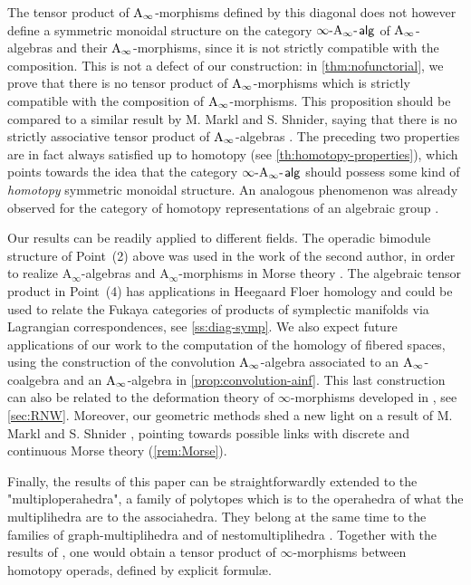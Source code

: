 \documentclass[10pt]{amsart}
\theoremstyle{remark}
\begin{document}
The tensor product of $\mathrm{A}_\infty$-morphisms defined by this diagonal does not however define a symmetric monoidal structure on the category $\infty\text{-}\mathrm{A}_\infty\text{-\hspace{1pt}}\mathsf{alg}$ of $\mathrm{A}_\infty$-algebras and their $\mathrm{A}_\infty$-morphisms, since it is not strictly compatible with the composition. 
This is not a defect of our construction: in \cref{thm:nofunctorial}, we prove that there is no tensor product of $\mathrm{A}_\infty$-morphisms which is strictly compatible with the composition of $\mathrm{A}_\infty$-morphisms. 
This proposition should be compared to a similar result by M. Markl and S. Shnider, saying that there is no strictly associative tensor product of $\mathrm{A}_\infty$-algebras \cite[Theorem 13]{MarklShnider06}.
The preceding two properties are in fact always satisfied up to homotopy (see \cref{th:homotopy-properties}), which points towards the idea that the category $\infty\text{-}\mathrm{A}_\infty\text{-\hspace{1pt}}\mathsf{alg}$ should possess some kind of \textit{homotopy} symmetric monoidal structure. 
An analogous phenomenon was already observed for the category of homotopy representations of an algebraic group \cite{AriasAbadCrainicDherin11,poliakova2020cellular}.

Our results can be readily applied to different fields. 
The operadic bimodule structure of Point~(2) above was used in the work of the second author, in order to realize $\mathrm{A}_\infty$-algebras and $\mathrm{A}_\infty$-morphisms in Morse theory \cite{mazuir-I,mazuir-II}. 
The algebraic tensor product in Point~(4) has applications in Heegaard Floer homology and could be used to relate the Fukaya categories of products of symplectic manifolds via Lagrangian correspondences, see \cref{ss:diag-symp}.
We also expect future applications of our work to the computation of the homology of fibered spaces, using the construction of the convolution $\mathrm{A}_\infty$-algebra associated to an $\mathrm{A}_\infty$-coalgebra and an $\mathrm{A}_\infty$-algebra in \cref{prop:convolution-ainf}.
This last construction can also be related to the deformation theory of $\infty$-morphisms developed in \cite{RobertNicoudWierstraI,RobertNicoudWierstraII}, see \cref{sec:RNW}.
Moreover, our geometric methods shed a new light on a result of M. Markl and S. Shnider \cite{MarklShnider06}, pointing towards possible links with discrete and continuous Morse theory (\cref{rem:Morse}). 


Finally, the results of this paper can be straightforwardly extended to the "multiploperahedra", a family of polytopes which is to the operahedra of \cite{LA21} what the multiplihedra are to the associahedra. 
They belong at the same time to the families of graph-multiplihedra \cite{DevadossForcey08} and of nestomultiplihedra \cite{AD13}.  
Together with the results of \cite[Section 4]{LA21}, one would obtain a tensor product of $\infty$-morphisms between homotopy operads, defined by explicit formul\ae. 
\end{document}
